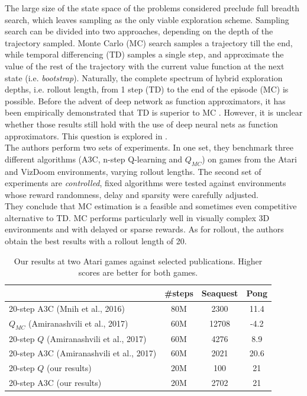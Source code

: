 \documentclass{article}
\begin{document}
The large size of the state space of the problems considered preclude full breadth
search, which leaves sampling as the only viable exploration scheme. Sampling
search can be divided into two approaches, depending on the depth of the trajectory
sampled. Monte Carlo (MC) search samples a trajectory till the end, while temporal
differencing (TD) samples a single step, and approximate the value of the rest of the
trajectory with the current value function at the next state (i.e. \emph{bootstrap}).
Naturally, the complete spectrum of hybrid exploration depths, i.e. rollout length,
from 1 step (TD) to the end of the episode (MC) is possible.
Before the advent of deep network as function approximators, it has been empirically
demonstrated that TD is superior to MC \citep{sutton1995}. However, it is unclear
whether those results still hold with the use of deep neural nets as function approximators.
This question is explored in \citep{amiranashvili2018analyzing}. \\

The authors perform two sets of experiments. In one set, they benchmark three different
algorithms (A3C, n-step Q-learning and $Q_{MC}$) on games from the Atari and VizDoom environments,
varying rollout lengths. The second set of experiments are \emph{controlled}, fixed algorithms
were tested against environments whose reward randomness, delay and sparsity were
carefully adjusted.\\

They conclude that MC estimation is a feasible and sometimes even competitive alternative
to TD. MC performs particularly well in visually complex 3D environments
and with delayed or sparse rewards. As for rollout, the authors obtain the
best results with a rollout length of 20.

\begin{table}[H]
\centering
\label{table1}
    \begin{tabular}{@{}l|c|cc}
    \toprule
                                             & \#steps  & Seaquest  & Pong  \\ \midrule
    20-step A3C (Mnih et al., 2016)          & 80M      & 2300      & 11.4  \\ \midrule
    $Q_{MC}$ (Amiranashvili et al., 2017)    & 60M      & 12708     & -4.2  \\
    20-step $Q$ (Amiranashvili et al., 2017) & 60M      & 4276      & 8.9   \\
    20-step A3C (Amiranashvili et al., 2017) & 60M      & 2021      & 20.6  \\ \midrule
    20-step $Q$ (our results)                & 20M      & 100       & 21    \\
    20-step A3C (our results)                & 20M      & 2702      & 21    \\ \bottomrule
    \end{tabular}
\caption{Our results at two Atari games against selected publications. Higher scores are better for both games.}
\end{table}
\end{document}
